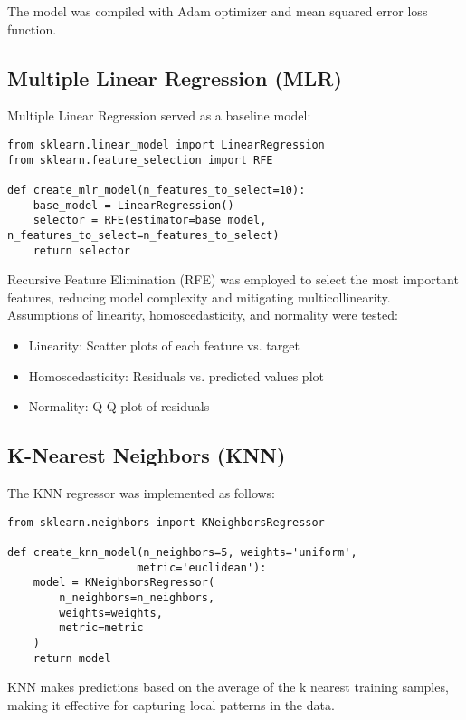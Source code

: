 \documentclass[12pt]{article}
\begin{document}
The model was compiled with Adam optimizer and mean squared error loss function.

\subsection{Multiple Linear Regression (MLR)}
\label{subsec:mlr}

Multiple Linear Regression served as a baseline model:

\begin{verbatim}
from sklearn.linear_model import LinearRegression
from sklearn.feature_selection import RFE

def create_mlr_model(n_features_to_select=10):
    base_model = LinearRegression()
    selector = RFE(estimator=base_model, n_features_to_select=n_features_to_select)
    return selector
\end{verbatim}

Recursive Feature Elimination (RFE) was employed to select the most important features, reducing model complexity and mitigating multicollinearity. Assumptions of linearity, homoscedasticity, and normality were tested:

\begin{itemize}
    \item Linearity: Scatter plots of each feature vs. target
    \item Homoscedasticity: Residuals vs. predicted values plot
    \item Normality: Q-Q plot of residuals
\end{itemize}

\subsection{K-Nearest Neighbors (KNN)}
\label{subsec:knn}

The KNN regressor was implemented as follows:

\begin{verbatim}
from sklearn.neighbors import KNeighborsRegressor

def create_knn_model(n_neighbors=5, weights='uniform', 
                    metric='euclidean'):
    model = KNeighborsRegressor(
        n_neighbors=n_neighbors,
        weights=weights,
        metric=metric
    )
    return model
\end{verbatim}

KNN makes predictions based on the average of the k nearest training samples, making it effective for capturing local patterns in the data.
\end{document}
